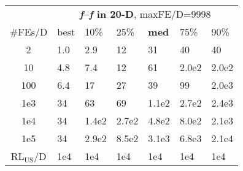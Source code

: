 \begin{tabular}{c|llllll}
 & \multicolumn{6}{|c}{\textbf{\textit{f}\raisebox{-0.35ex}{1}--\textit{f}\raisebox{-0.35ex}{24} in 20-D}, maxFE/D=9998}\\
\#FEs/D & best & 10\% & 25\% & \textbf{med} & 75\% & 90\%\\
2 & \hspace*{1ex}1.0 & \hspace*{1ex}2.9 & 12 & 31 & 40 & 40\\
10 & \hspace*{1ex}4.8 & \hspace*{1ex}7.4 & 12 & 61 & 2.0e2 & 2.0e2\\
100 & \hspace*{1ex}6.4 & 17 & 27 & 39 & 99 & 2.0e3\\
1e3 & 34 & 63 & 69 & 1.1e2 & 2.7e2 & 2.4e3\\
1e4 & 34 & 1.4e2 & 2.7e2 & 4.8e2 & 8.0e2 & 2.1e3\\
1e5 & 34 & 2.9e2 & 8.5e2 & 3.1e3 & 6.8e3 & 2.1e4\\
$\text{RL}_{\text{US}}$/D & 1e4 & 1e4 & 1e4 & 1e4 & 1e4 & 1e4
\end{tabular}
